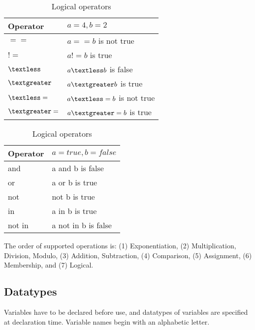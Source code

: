 \begin{table}[h]
\begin{center}
    \parbox{.4\linewidth}{
        \begin{tabular}{| l | l |}
        \hline
        Operator & $a=4, b=2$ \\ \hline
        $==$ & $a == b$ is not true \\ \hline
        $!=$ & $a != b$ is true \\ \hline
        $\textless$  & $a \textless b$ is false \\ \hline
        $\textgreater$  & $a \textgreater b$ is true \\ \hline
        $\textless=$ & $a \textless= b$ is not true \\ \hline
        $\textgreater=$ & $a \textgreater= b$ is true \\ \hline
        \end{tabular}
        \caption{Comparison operators.}
    }
    \parbox{.4\linewidth}{
        \begin{tabular}{| l | l |}
        \hline
        Operator & $a = true, b = false$ \\ \hline
        and & a and b is false \\ \hline
        or & a or b is true\\ \hline
        not & not b is true \\ \hline
        in & a in b is true \\ \hline
        not in & a not in b is false\\ \hline
        \end{tabular}
        \caption{Logical operators}
     }
\end{center}
\end{table}

The order of supported operations
is: (1) Exponentiation, (2) Multiplication, Division, Modulo, (3) Addition,
Subtraction, (4) Comparison, (5) Assignment, (6) Membership, and (7) Logical.

\subsection*{Datatypes}
Variables have to be declared before use, and datatypes of
variables are specified at declaration time. Variable names 
begin with an alphabetic letter.

